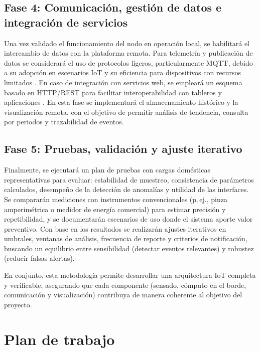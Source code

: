 ﻿\documentclass[12pt,openright,oneside]{report}
\theoremstyle{mytheoremstyle}
\theoremstyle{mytheoremstyle}
\theoremstyle{myproblemstyle}
\begin{document}
\subsection{Fase 4: Comunicación, gestión de datos e integración de servicios}
\label{subsubsec:met_com}

Una vez validado el funcionamiento del nodo en operación local, se habilitará el intercambio de datos con la plataforma remota. Para telemetría y publicación de datos se considerará el uso de protocolos ligeros, particularmente MQTT, debido a su adopción en escenarios IoT y su eficiencia para dispositivos con recursos limitados \cite{mqtt-oasis}. En caso de integración con servicios web, se empleará un esquema basado en HTTP/REST para facilitar interoperabilidad con tableros y aplicaciones \cite{fielding2000rest}. En esta fase se implementará el almacenamiento histórico y la visualización remota, con el objetivo de permitir análisis de tendencia, consulta por periodos y trazabilidad de eventos.

\subsection{Fase 5: Pruebas, validación y ajuste iterativo}
\label{subsubsec:met_valid}

Finalmente, se ejecutará un plan de pruebas con cargas domésticas representativas para evaluar: estabilidad de muestreo, consistencia de parámetros calculados, desempeño de la detección de anomalías y utilidad de las interfaces. Se compararán mediciones con instrumentos convencionales (p.\,ej., pinza amperimétrica o medidor de energía comercial) para estimar precisión y repetibilidad, y se documentarán escenarios de uso donde el sistema aporte valor preventivo. Con base en los resultados se realizarán ajustes iterativos en umbrales, ventanas de análisis, frecuencia de reporte y criterios de notificación, buscando un equilibrio entre sensibilidad (detectar eventos relevantes) y robustez (reducir falsas alertas).

En conjunto, esta metodología permite desarrollar una arquitectura IoT completa y verificable, asegurando que cada componente (sensado, cómputo en el borde, comunicación y visualización) contribuya de manera coherente al objetivo del proyecto.
\section{Plan de trabajo}
\label{subsec:plan_trabajo}
\end{document}
